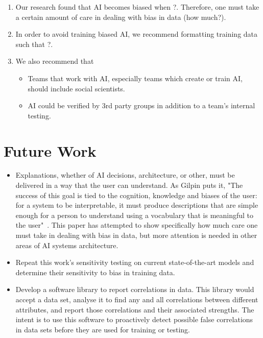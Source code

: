 \documentclass[]{report}
\begin{document}
\begin{enumerate}
    \item Our research found that AI becomes biased when ?. Therefore, one must take a certain
    amount of care in dealing with bias in data (how much?).
    
    \item In order to avoid training biased AI, we recommend formatting training data such that ?.
    
    \item We also recommend that
    \begin{itemize}
        \item Teams that work with AI, especially teams which create or train AI, should include
        social scientists.
        
        \item AI could be verified by 3rd party groups in addition to a team's internal testing.
    \end{itemize}
\end{enumerate}

\FloatBarrier
\section{Future Work}

\begin{itemize}
    \item Explanations, whether of AI decisions, architecture, or other, must be delivered in a way
    that the user can understand. As Gilpin puts it, "The success of this goal is tied to the
    cognition, knowledge and biases of the user: for a system to be interpretable, it must produce
    descriptions that are simple enough for a person to understand using a vocabulary that is
    meaningful to the user"~\cite{gilpin2018explaining}. This paper has attempted to show
    specifically how much care one must take in dealing with bias in data, but more attention is
    needed in other areas of AI systems architecture.

    \item Repeat this work's sensitivity testing on current state-of-the-art models and determine
    their sensitivity to bias in training data.

    \item Develop a software library to report correlations in data. This library would accept a
    data set, analyse it to find any and all correlations between different attributes, and report
    those correlations and their associated strengths. The intent is to use this software to
    proactively detect possible false correlations in data sets before they are used for training or
    testing.
\end{itemize}
\end{document}
